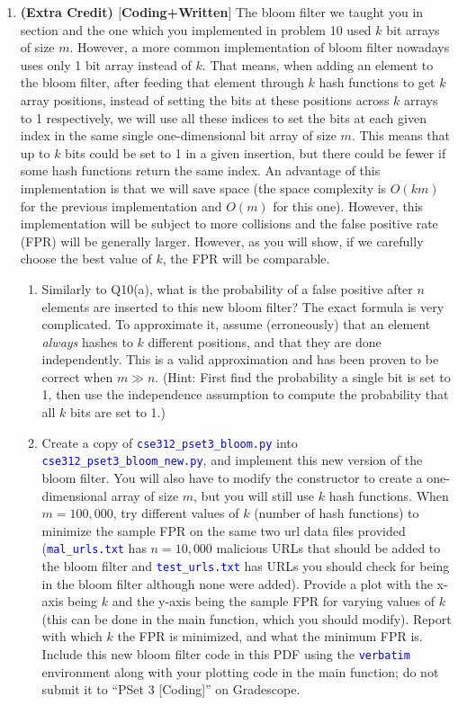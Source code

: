 \documentclass[12pt]{article}
\def\code#1{\textcolor{blue}{\texttt{#1}}}
\renewcommand{\|}{\mid}
\begin{document}
\begin{enumerate}
\pagebreak

\item \textbf{(Extra Credit) $[$Coding+Written$]$} The bloom filter we taught you in section and the one which you implemented in problem 10 used $k$ bit arrays of size $m$. However, a more common implementation of bloom filter nowadays uses only 1 bit array instead of $k$. That means, when adding an element to the bloom filter, after feeding that element through $k$ hash functions to get $k$ array positions, instead of setting the bits at these positions across $k$ arrays to 1 respectively, we will use all these indices to set the bits at each given index in the same single one-dimensional bit array of size $m$. This means that up to $k$ bits could be set to 1 in a given insertion, but there could be fewer if some hash functions return the same index. An advantage of this implementation is that we will save space (the space complexity is $O(km)$ for the previous implementation and $O(m)$ for this one). However, this implementation will be subject to more collisions and the false positive rate (FPR) will be generally larger. However, as you will show, if we carefully choose the best value of $k$, the FPR will be comparable.
\begin{enumerate}
    \item Similarly to Q10(a), what is the probability of a false positive after $n$ elements are inserted to this new bloom filter? The exact formula is very complicated. To approximate it, assume (erroneously) that an element \textit{always} hashes to $k$ different positions, and that they are done independently. This is a valid approximation and has been proven to be correct when $m \gg n$. (Hint: First find the probability a single bit is set to 1, then use the independence assumption to compute the probability that all $k$ bits are set to 1.)
    \item Create a copy of \code{cse312\_pset3\_bloom.py} into \code{cse312\_pset3\_bloom\_new.py}, and implement this new version of the bloom filter. You will also have to modify the constructor to create a one-dimensional array of size $m$, but you will still use $k$ hash functions. When $m = 100,000$, try different values of $k$ (number of hash functions) to minimize the sample FPR on the same two url data files provided (\code{mal\_urls.txt} has $n=10,000$ malicious URLs that should be added to the bloom filter and \code{test\_urls.txt} has URLs you should check for being in the bloom filter although none were added). Provide a plot with the x-axis being $k$ and the y-axis being the sample FPR for varying values of $k$ (this can be done in the main function, which you should modify). Report with which $k$ the FPR is minimized, and what the minimum FPR is. Include this new bloom filter code in this PDF using the \code{verbatim} environment along with your plotting code in the main function;  do not submit it to ``PSet 3 [Coding]'' on Gradescope. %
    

\end{enumerate}
\end{enumerate}
\end{document}
